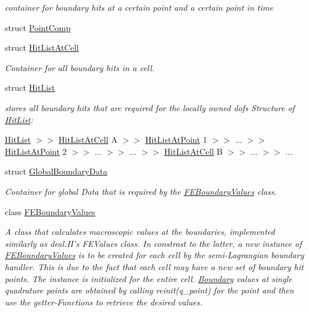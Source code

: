 \begin{DoxyCompactItemize}
\begin{DoxyCompactList}\small\item\em container for boundary hits at a certain point and a certain point in time \item\end{DoxyCompactList}\item 
struct \hyperlink{structnatrium_1_1PointComp}{PointComp}
\item 
struct \hyperlink{structnatrium_1_1HitListAtCell}{HitListAtCell}
\begin{DoxyCompactList}\small\item\em Container for all boundary hits in a cell. \item\end{DoxyCompactList}\item 
struct \hyperlink{structnatrium_1_1HitList}{HitList}
\begin{DoxyCompactList}\small\item\em stores all boundary hits that are required for the locally owned dofs Structure of \hyperlink{structnatrium_1_1HitList}{HitList}:
\begin{DoxyItemize}
\item \hyperlink{structnatrium_1_1HitList}{HitList} $>$$>$ \hyperlink{structnatrium_1_1HitListAtCell}{HitListAtCell} A $>$$>$ \hyperlink{structnatrium_1_1HitListAtPoint}{HitListAtPoint} 1 $>$$>$ ... $>$$>$ \hyperlink{structnatrium_1_1HitListAtPoint}{HitListAtPoint} 2 $>$$>$ ... $>$$>$ ... $>$$>$ \hyperlink{structnatrium_1_1HitListAtCell}{HitListAtCell} B $>$$>$ ... $>$$>$ ... 
\end{DoxyItemize}\item\end{DoxyCompactList}\item 
struct \hyperlink{structnatrium_1_1GlobalBoundaryData}{GlobalBoundaryData}
\begin{DoxyCompactList}\small\item\em Container for global Data that is required by the \hyperlink{classnatrium_1_1FEBoundaryValues}{FEBoundaryValues} class. \item\end{DoxyCompactList}\item 
class \hyperlink{classnatrium_1_1FEBoundaryValues}{FEBoundaryValues}
\begin{DoxyCompactList}\small\item\em A class that calculates macroscopic values at the boundaries, implemented similarly as deal.II's FEValues class. In constrast to the latter, a new instance of \hyperlink{classnatrium_1_1FEBoundaryValues}{FEBoundaryValues} is to be created for each cell by the semi-\/Lagrangian boundary handler. This is due to the fact that each cell may have a new set of boundary hit points. The instance is initialized for the entire cell. \hyperlink{classnatrium_1_1Boundary}{Boundary} values at single quadrature points are obtained by calling reinit(q\_\-point) for the point and then use the getter-\/Functions to retrieve the desired values. \item\end{DoxyCompactList}\item 

\end{DoxyCompactItemize}
